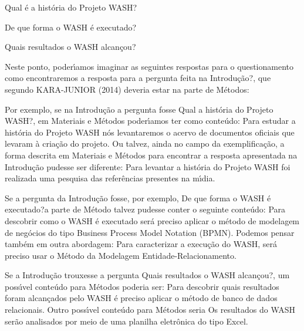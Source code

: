 \documentclass[
12pt,		%
openright,	%
twoside,  %
a4paper,			%
chapter=TITLE,		%
english,			%
french,				%
spanish,			%
brazil				%
]{USPSC-classe/USPSC}
\begin{document}
\begin{alineas}
\item \textquotedbl Qual \'e a hist\'oria do Projeto WASH?\textquotedbl 
\item \textquotedbl De que forma o WASH \'e executado?\textquotedbl 
\item \textquotedbl Quais resultados o WASH alcan\c{c}ou?\textquotedbl 
\end{alineas}

Neste ponto, poder\'{\i}amos imaginar as seguintes respostas para o questionamento \textquotedbl como encontraremos a resposta para a pergunta feita na Introdu\c{c}\~ao?\textquotedbl , que segundo KARA-JUNIOR (2014) deveria estar na parte de M\'etodos:



\begin{alineas}
\item Por exemplo, se na Introdu\c{c}\~ao a pergunta fosse \textquotedbl Qual a hist\'oria do Projeto WASH?\textquotedbl , em Materiais e M\'etodos poder\'{\i}amos ter como  conte\'udo: \textquotedbl Para estudar a hist\'oria do Projeto WASH n\'os levantaremos o acervo de documentos oficiais que levaram \`a cria\c{c}\~ao do projeto\textquotedbl . Ou talvez, ainda no campo da exemplifica\c{c}\~ao, a forma descrita em Materiais e M\'etodos para  encontrar a resposta apresentada na Introdu\c{c}\~ao pudesse ser diferente: \textquotedbl Para levantar a hist\'oria do Projeto WASH foi realizada uma pesquisa das refer\^encias presentes na m\'{\i}dia\textquotedbl .
\item Se a pergunta da Introdu\c{c}\~ao fosse, por exemplo, \textquotedbl De que forma o WASH \'e executado?\textquotedbl  a parte de M\'etodo talvez pudesse conter o seguinte conte\'udo: \textquotedbl Para descobrir como o WASH \'e executado ser\'a preciso aplicar o m\'etodo de modelagem de neg\'ocios do tipo Business Process Model Notation (BPMN)\textquotedbl . Podemos pensar tamb\'em em outra abordagem: \textquotedbl Para caracterizar a execu\c{c}\~ao do WASH, ser\'a preciso usar o M\'etodo da Modelagem Entidade-Relacionamento\textquotedbl .
\item Se a Introdu\c{c}\~ao trouxesse a pergunta \textquotedbl Quais resultados o WASH alcan\c{c}ou?\textquotedbl , um poss\'{\i}vel conte\'udo para M\'etodos poderia ser: \textquotedbl Para descobrir quais resultados foram alcan\c{c}ados pelo WASH \'e preciso aplicar o m\'etodo de banco de dados relacionais\textquotedbl . Outro poss\'{\i}vel conte\'udo para M\'etodos seria \textquotedbl Os resultados do WASH ser\~ao analisados por meio de uma planilha eletr\^onica do tipo Excel\textquotedbl .
\end{alineas}
\end{document}
